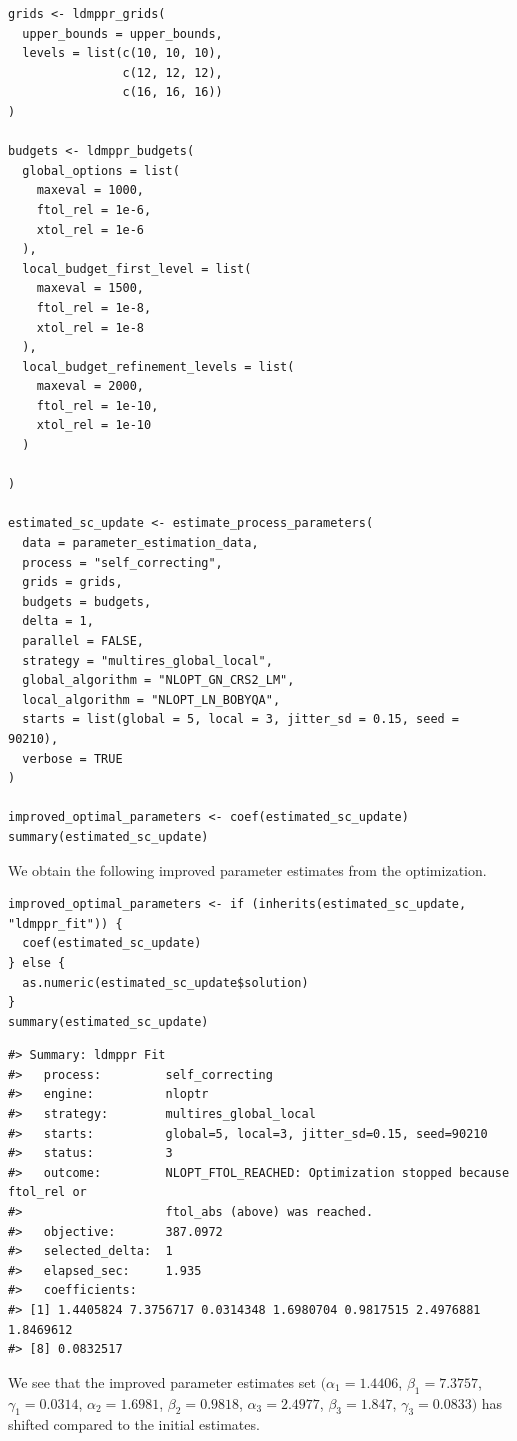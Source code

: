 \begin{verbatim}
grids <- ldmppr_grids(
  upper_bounds = upper_bounds,
  levels = list(c(10, 10, 10),
                c(12, 12, 12),
                c(16, 16, 16))
)

budgets <- ldmppr_budgets(
  global_options = list(
    maxeval = 1000,
    ftol_rel = 1e-6,
    xtol_rel = 1e-6
  ),
  local_budget_first_level = list(
    maxeval = 1500,
    ftol_rel = 1e-8,
    xtol_rel = 1e-8
  ),
  local_budget_refinement_levels = list(
    maxeval = 2000,
    ftol_rel = 1e-10,
    xtol_rel = 1e-10
  )

)

estimated_sc_update <- estimate_process_parameters(
  data = parameter_estimation_data,
  process = "self_correcting",
  grids = grids,
  budgets = budgets,
  delta = 1,
  parallel = FALSE,
  strategy = "multires_global_local",
  global_algorithm = "NLOPT_GN_CRS2_LM",
  local_algorithm = "NLOPT_LN_BOBYQA",
  starts = list(global = 5, local = 3, jitter_sd = 0.15, seed = 90210),
  verbose = TRUE
)

improved_optimal_parameters <- coef(estimated_sc_update)
summary(estimated_sc_update)
\end{verbatim}

We obtain the following improved parameter estimates from the
optimization.

\begin{verbatim}
improved_optimal_parameters <- if (inherits(estimated_sc_update, "ldmppr_fit")) {
  coef(estimated_sc_update)
} else {
  as.numeric(estimated_sc_update$solution)
}
summary(estimated_sc_update)
\end{verbatim}

\begin{verbatim}
#> Summary: ldmppr Fit
#>   process:         self_correcting
#>   engine:          nloptr
#>   strategy:        multires_global_local
#>   starts:          global=5, local=3, jitter_sd=0.15, seed=90210
#>   status:          3
#>   outcome:         NLOPT_FTOL_REACHED: Optimization stopped because ftol_rel or
#>                    ftol_abs (above) was reached.
#>   objective:       387.0972
#>   selected_delta:  1
#>   elapsed_sec:     1.935
#>   coefficients:
#> [1] 1.4405824 7.3756717 0.0314348 1.6980704 0.9817515 2.4976881 1.8469612
#> [8] 0.0832517
\end{verbatim}

We see that the improved parameter estimates set
\((\alpha_1 = 1.4406\),
\(\beta_1 = 7.3757\),
\(\gamma_1 = 0.0314\),
\(\alpha_2 = 1.6981\),
\(\beta_2 = 0.9818\),
\(\alpha_3 = 2.4977\),
\(\beta_3 = 1.847\),
\(\gamma_3 = 0.0833)\) has shifted
compared to the initial estimates.

